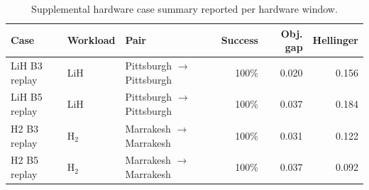 \begin{table}[t]
\centering
{}
\begin{tabular}{lllrrr}
\toprule
Case & Workload & Pair & Success & Obj. gap & Hellinger \\
\midrule
LiH B3 replay & LiH & Pittsburgh $\rightarrow$ Pittsburgh & 100\% & 0.020 & 0.156 \\
LiH B5 replay & LiH & Pittsburgh $\rightarrow$ Pittsburgh & 100\% & 0.037 & 0.184 \\
H2 B3 replay & H$_2$ & Marrakesh $\rightarrow$ Marrakesh & 100\% & 0.031 & 0.122 \\
H2 B5 replay & H$_2$ & Marrakesh $\rightarrow$ Marrakesh & 100\% & 0.037 & 0.092 \\
\bottomrule
\end{tabular}
\caption{Supplemental hardware case summary reported per hardware window.}
\label{tab:supplemental\_hw\_case\_summary}
\end{table}
